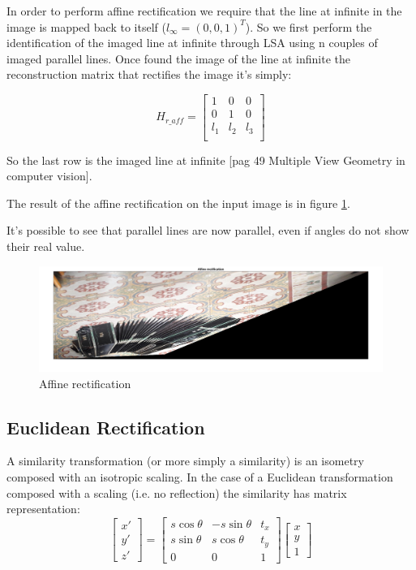 \documentclass[11pt, oneside]{article}   	%
\begin{document}
In order to perform affine rectification we require that the line at infinite in the image is mapped back to itself ($l_{\infty} = (0,0,1)^{T}$).
So we first perform the identification of the imaged line at infinite through LSA using n couples of imaged parallel lines. 
Once found the image of the line at infinite the reconstruction matrix that rectifies the image it's simply:

\begin{equation}
H_{r\_aff} =\begin{bmatrix} 
1& 0 & 0 \\
0 &  1 & 0 \\
l_1 &  l_2 & l_3 \\
\end{bmatrix}
\end{equation}

So the last row is the imaged line at infinite [pag 49 Multiple View Geometry in computer vision].

The result of the affine rectification on the input image is in figure  {\ref{affine}}.

It's possible to see that parallel lines are now parallel, even if angles do not show their real value.

\begin{figure}
\includegraphics[width=0.8\linewidth]{affine_rectification.jpg}
\caption{Affine rectification}
\label{affine}
\end{figure}

\subsection{Euclidean Rectification} \label{seceucl}
A similarity transformation (or more simply a similarity) is an isometry composed with an isotropic scaling. In the case of a Euclidean transformation composed with a scaling (i.e. no reflection) the similarity has matrix representation:
\begin{equation}
\begin{bmatrix}
x' \\ y' \\ z'
\end{bmatrix}
=
\begin{bmatrix}
s \cos\theta & - s \sin\theta & t_x \\ s \sin\theta & s \cos\theta & t_y \\ 0 & 0 & 1
\end{bmatrix}
\begin{bmatrix}
x \\ y \\ 1
\end{bmatrix}
\end{equation}
\end{document}
